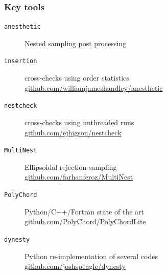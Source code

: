 \documentclass[aspectratio=169]{beamer}
\begin{document}
\begin{frame}
    \frametitle{Key tools}
    \begin{description}
        \item[\texttt{anesthetic}] Nested sampling post processing \\
        \item[\texttt{insertion}] cross-checks using order statistics 
            \hspace{5pt}\url{github.com/williamjameshandley/anesthetic}
        \item[\texttt{nestcheck}] cross-checks using unthreaded runs \\
            \hspace{5pt}\url{github.com/ejhigson/nestcheck}
        \item[\texttt{MultiNest}] Ellipsoidal rejection sampling \\
            \hspace{5pt}\url{github.com/farhanferoz/MultiNest}
        \item[\texttt{PolyChord}] Python/C++/Fortran state of the art \\
            \hspace{5pt}\url{github.com/PolyChord/PolyChordLite} 
        \item[\texttt{dynesty}] Python re-implementation of several codes \\
            \hspace{5pt}\url{github.com/joshspeagle/dynesty}
    \end{description}
\end{frame}
\end{document}
